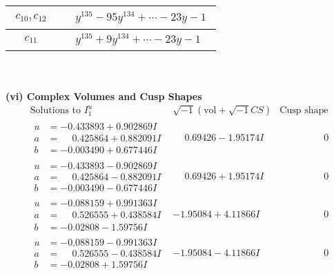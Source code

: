 \documentclass[1p]{elsarticle_modified}
\theoremstyle{definition}
\newcommand{\I}{\sqrt{-1}}
\begin{document}
\begin{tabular}{m{50pt}|m{274pt}}
\hline $$\begin{aligned}c_{10},c_{12}\end{aligned}$$&$\begin{aligned}
&y^{135}-95 y^{134}+\cdots-23 y-1
\end{aligned}$\\
\hline $$\begin{aligned}c_{11}\end{aligned}$$&$\begin{aligned}
&y^{135}+9 y^{134}+\cdots-23 y-1
\end{aligned}$\\
\hline
\end{tabular}\\~\\
\newpage\flushleft \textbf{(vi) Complex Volumes and Cusp Shapes}
$$\begin{array}{c|c|c}  
\text{Solutions to }I^u_{1}& \I (\text{vol} + \sqrt{-1}CS) & \text{Cusp shape}\\
 \hline 
\begin{aligned}
u &= -0.433893 + 0.902869 I \\
a &= \phantom{-}0.425864 + 0.882091 I \\
b &= -0.003490 + 0.677446 I\end{aligned}
 & \phantom{-}0.69426 - 1.95174 I & \phantom{-0.000000 } 0 \\ \hline\begin{aligned}
u &= -0.433893 - 0.902869 I \\
a &= \phantom{-}0.425864 - 0.882091 I \\
b &= -0.003490 - 0.677446 I\end{aligned}
 & \phantom{-}0.69426 + 1.95174 I & \phantom{-0.000000 } 0 \\ \hline\begin{aligned}
u &= -0.088159 + 0.991363 I \\
a &= \phantom{-}0.526555 + 0.438584 I \\
b &= -0.02808 - 1.59756 I\end{aligned}
 & -1.95084 + 4.11866 I & \phantom{-0.000000 } 0 \\ \hline\begin{aligned}
u &= -0.088159 - 0.991363 I \\
a &= \phantom{-}0.526555 - 0.438584 I \\
b &= -0.02808 + 1.59756 I\end{aligned}
 & -1.95084 - 4.11866 I & \phantom{-0.000000 } 0 \\ \hline\begin{aligned}

\end{aligned}
\end{array}$$
\end{document}

